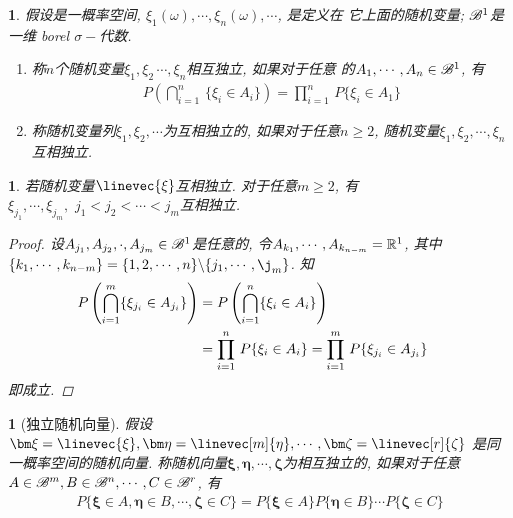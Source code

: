 \newtheorem{independentity_of_random_var}[theorem_root]{}
\begin{independentity_of_random_var}
假设\prbsp 是一概率空间, \(\xi_1(\omega),\cdots,\xi_n(\omega),\cdots\), 是定义在
它上面的随机变量; \(\sgmb^1\)是 一维 borel \(\sigma-\)代数.
\begin{enumerate}
    \item 称\(n\)个随机变量\(\xi_1, \xi_2\,\cdots,\xi_n\)相互独立, 如果对于任意
    的\(A_1, \cdots, A_n\in\sgmb^1\), 有
    \begin{align}
        P\left(\bigcap\limits_{i=1}^{n}\,\{\xi_i\in A_i\}\right) = \prod\limits_{i = 1}^{n}\,P\{\xi_i\in A_1\}
    \end{align}
    \item 称随机变量列\(\xi_1, \xi_2, \cdots\)为互相独立的, 如果对于任意\(n\ge 2\), 
    随机变量\(\xi_1, \xi_2, \cdots, \xi_n\)互相独立.
\end{enumerate}
\end{independentity_of_random_var}

\newtheorem{independentity_of_any__}[theorem_root]{\theorem}
\begin{independentity_of_any__}
若随机变量\(\linevec{\xi}\)互相独立. 对于任意\(m\ge 2\), 有\(\xi_{j_1},\cdots,\xi_{j_m},\,\,j_1<j_2<\cdots<j_m\)互相独立.
\begin{proof}
    设\(A_{j_1}, A_{j_2},\cdot,A_{j_m}\in \sgmb^1\)是任意的, 令\(A_{k_1}, \cdots, A_{k_{n-m}} = \Rs^1\), 
    其中\(\{k_1,\cdots,k_{n-m}\} = \{1, 2, \cdots, n\} \backslash \{j_{1}, \cdots, \j_{m}\}\). 知
    \begin{align}
        P\left(\bigcap\limits_{i=1}^{m}\{\xi_{j_i}\in A_{j_i}\}\right) &= 
        P\left(\bigcap\limits_{i=1}^{n}\{\xi_{i}\in A_{i}\}\right)\cr 
        &= \prod\limits_{i=1}^{n}\,P\{\xi_i\in A_i\} = 
        \prod\limits_{i=1}^{m}\,P\{\xi_{j_i}\in A_{j_i}\} 
    \end{align}
    即成立.
\end{proof}
\end{independentity_of_any__}

\newtheorem{independent_random_vector}[theorem_root]{}
\begin{independent_random_vector}[独立随机向量]
假设\(\bm\xi = \linevec{\xi}, \bm\eta = \linevec[m]{\eta},\cdots, \bm\zeta = \linevec[r]{\zeta}\)
是同一概率空间\prbsp 的随机向量. 称随机向量\(\bm\xi, \bm\eta,\cdots,\bm\zeta\)为相互独立的, 
如果对于任意\(A\in\sgmb^m, B\in\sgmb^n, \cdots, C\in\sgmb^r\), 有
\begin{align}
    P\{\bm\xi\in A, \bm\eta\in B, \cdots, \bm\zeta\in C\} = 
    P\{\bm\xi\in A\}
    P\{\bm\eta\in B\}
    \cdots
    P\{\bm\zeta\in C\}
\end{align}
\end{independent_random_vector}

